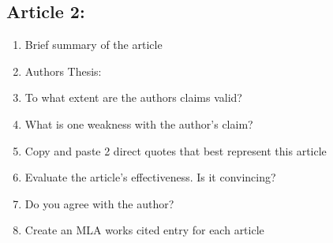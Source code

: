 \documentclass[11pt]{article}
\begin{document}
\subsection{Article 2:}
\label{sec:org8b8fe2a}
\begin{enumerate}
\item Brief summary of the article
\item Authors Thesis:
\item To what extent are the authors claims valid?
\item What is one weakness with the author's claim?
\item Copy and paste 2 direct quotes that best represent this article
\item Evaluate the article's effectiveness. Is it convincing?
\item Do you agree with the author?
\item Create an MLA works cited entry for each article
\end{enumerate}
\end{document}
